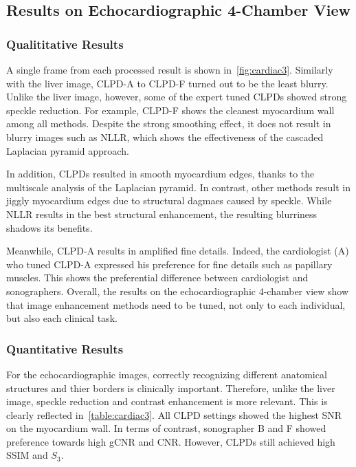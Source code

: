 \subsection{Results on Echocardiographic 4-Chamber View}

\subsubsection{Qualititative Results}
A single frame from each processed result is shown in~\cref{fig:cardiac3}.
Similarly with the liver image, CLPD-A to CLPD-F turned out to be the least blurry.
Unlike the liver image, however, some of the expert tuned CLPDs showed strong speckle reduction.
For example, CLPD-F shows the cleanest myocardium wall among all methods.
Despite the strong smoothing effect, it does not result in blurry images such as NLLR, which shows the effectiveness of the cascaded Laplacian pyramid approach.

In addition, CLPDs resulted in smooth myocardium edges, thanks to the multiscale analysis of the Laplacian pyramid.
In contrast, other methods result in jiggly myocardium edges due to structural dagmaes caused by speckle.
While NLLR results in the best structural enhancement, the resulting blurriness shadows its benefits.

Meanwhile, CLPD-A results in amplified fine details.
Indeed, the cardiologist (A) who tuned CLPD-A expressed his preference for fine details such as papillary muscles.
This shows the preferential difference between cardiologist and sonographers.
Overall, the results on the echocardiographic 4-chamber view show that image enhancement methods need to be tuned, not only to each individual, but also each clinical task.

\subsubsection{Quantitative Results}

For the echocardiographic images, correctly recognizing different anatomical structures and thier borders is clinically important.
Therefore, unlike the liver image, speckle reduction and contrast enhancement is more relevant.
This is clearly reflected in~\cref{table:cardiac3}.
All CLPD settings showed the highest SNR on the myocardium wall.
In terms of contrast, sonographer B and F showed preference towards high gCNR and CNR.
However, CLPDs still achieved high SSIM and \(S_3\).


